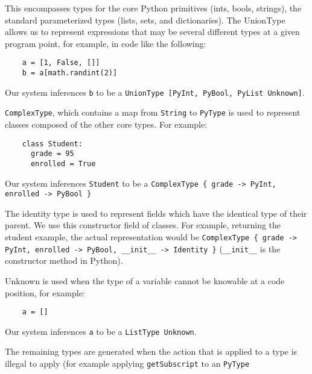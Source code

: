 \documentclass{article}[12pt]
\begin{document}
This encompasses types for the core Python primitives (ints, bools, strings), the standard parameterized types (lists, sets, and dictionaries). The UnionType allows us to represent expressions that may be several different types at a given program point, for example, in code like the following:

\begin{verbatim}
    a = [1, False, []]
    b = a[math.randint(2)]
\end{verbatim}

Our system inferences \verb=b= to be a \verb=UnionType [PyInt, PyBool, PyList Unknown]=.

\verb=ComplexType=, which contains a map from \verb=String= to \verb=PyType= is used to represent
classes composed of the other core types. For example:
\begin{verbatim}
    class Student:
      grade = 95 
      enrolled = True
\end{verbatim}

Our system inferences \verb=Student= to be a 
\verb=ComplexType { grade -> PyInt, enrolled -> PyBool }=

The identity type is used to represent fields which have the identical type of their parent. We use
this constructor field of classes. For example, returning the student example, the actual
representation would be
\verb=ComplexType { grade -> PyInt, enrolled -> PyBool, __init__ -> Identity }=
(\verb=__init__= is the constructor method in Python).

Unknown is used when the type of a variable cannot be knowable at a code position, for example:
\begin{verbatim}
    a = []
\end{verbatim}
Our system inferences \verb=a= to be a \verb=ListType Unknown=.

The remaining types are generated when the action that is applied to a type is illegal to apply (for
example applying \verb=getSubscript= to an \verb=PyType=
\end{document}
